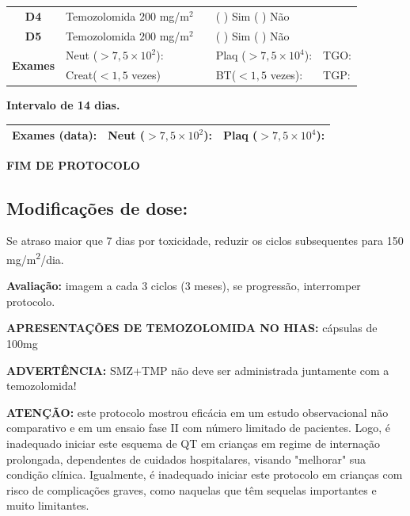 \documentclass[11pt,a4paper,oldfontcommands]{memoir}
\begin{document}
\begin{center}
\begin{table}[H]
\begin{tabular}{p{1cm}p{5cm}|p{1cm}|p{4.5cm}|p{2cm}}
    \multicolumn{1}{c|}{\multirow{1}{*}{\textbf{D4}}}&{Temozolomida \(200\) mg/m\(^2\)}&&{(  ) Sim (  ) Não}&\\
    \multicolumn{1}{c|}{\multirow{1}{*}{\textbf{D5}}}&{Temozolomida \(200\) mg/m\(^2\)}&&{(  ) Sim (  ) Não}&\\
    \hline
    \multicolumn{1}{c|}{\multirow{2}{*}{\textbf{Exames}}}&\multicolumn{2}{l|}{Neut (\(>7,5\times10^2\)):}&{Plaq (\(>7,5\times10^4\)):}&{TGO:}\\
    \cline{2-5}
    \multicolumn{1}{c|}{\multirow{2}{*}{{}}}&\multicolumn{2}{l|}{Creat(\(<1,5\) vezes)}&{BT(\(<1,5\) vezes):}&{TGP:}
    \\
    \hline
\end{tabular}
\end{table}
\textbf{Intervalo de 14 dias.}
\begin{table}[H]
\begin{tabular}{p{5cm}|p{5cm}|p{4.7cm}}
    \hline
    \textbf{Exames (data):}&{Neut (\(>7,5\times10^2\)):}&{Plaq (\(>7,5\times10^4\)):}
    \\
    \hline
\end{tabular}
\end{table}

\textbf{FIM DE PROTOCOLO}

\end{center}
\subsection{Modificações de dose:}
Se atraso maior que 7 dias por toxicidade, reduzir os ciclos subsequentes para 150 mg/m\textsuperscript{2}/dia.

\textbf{Avaliação:} imagem a cada 3 ciclos (3 meses), se progressão, interromper protocolo.

\textbf{APRESENTAÇÕES DE TEMOZOLOMIDA NO HIAS:} cápsulas de 100mg

\textbf{ADVERTÊNCIA:} SMZ+TMP não deve ser administrada juntamente com a temozolomida!

\textbf{ATENÇÃO:} este protocolo mostrou eficácia em um estudo observacional não comparativo e em um ensaio fase II com número limitado de pacientes. Logo, é inadequado iniciar este esquema de QT em crianças em regime de internação prolongada, dependentes de cuidados hospitalares, visando "melhorar" sua condição clínica. Igualmente, é inadequado iniciar este protocolo em crianças com risco de complicações graves, como naquelas que têm sequelas importantes e muito limitantes.
\end{document}
